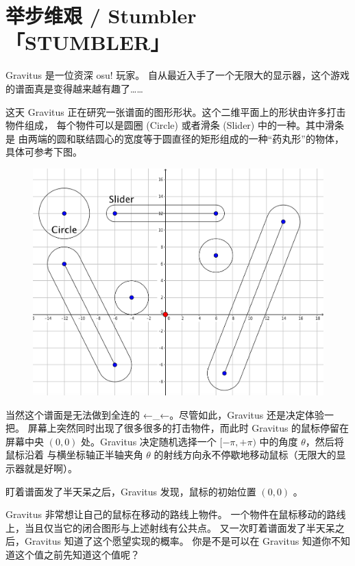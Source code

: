 \documentclass[UTF8, 11pt, a4paper]{article}
\begin{document}
\section*{举步维艰 / Stumbler \makebox[2.5em]{} \small{「STUMBLER」}}
Gravitus 是一位资深 osu! 玩家。%
自从最近入手了一个无限大的显示器，这个游戏的谱面真是变得越来越有趣了……

这天 Gravitus 正在研究一张谱面的图形形状。这个二维平面上的形状由许多打击物件组成，%
每个物件可以是圆圈 (Circle) 或者滑条 (Slider) 中的一种。其中滑条是%
由两端的圆和联结圆心的宽度等于圆直径的矩形组成的一种“药丸形”的物体，具体可参考下图。

\begin{figure}[h]\centering
\includegraphics[scale=0.22]{desc.png}
\end{figure}

当然这个谱面是无法做到全连的 ←\_←。尽管如此，Gravitus 还是决定体验一把。%
屏幕上突然同时出现了很多很多的打击物件，而此时 Gravitus 的鼠标停留在屏幕中央 $(0, 0)$ %
处。Gravitus 决定随机选择一个 $[-\pi, +\pi)$ 中的角度 $\theta$，然后将鼠标沿着%
与横坐标轴正半轴夹角 $\theta$ 的射线方向永不停歇地移动鼠标（无限大的显示器就是好啊）。

盯着谱面发了半天呆之后，Gravitus 发现，鼠标的初始位置 $(0, 0)$%
  。

Gravitus 非常想让自己的鼠标在移动的路线上物件。%
一个物件在鼠标移动的路线上，当且仅当它的闭合图形与上述射线有公共点。%
又一次盯着谱面发了半天呆之后，Gravitus 知道了这个愿望实现的概率。%
你是不是可以在 Gravitus 知道你不知道这个值之前先知道这个值呢？
\end{document}
